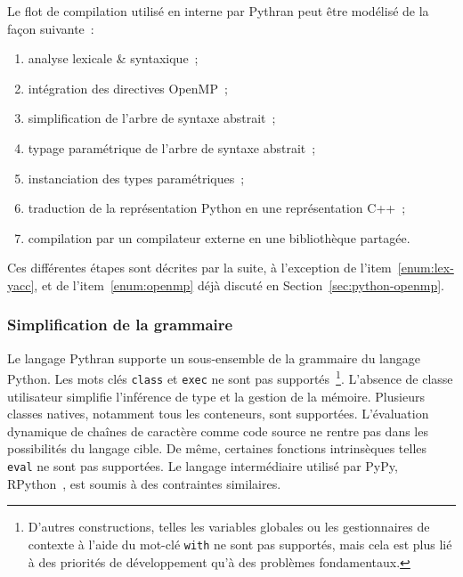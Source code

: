 \documentclass[renpar]{compas2013}
\begin{document}
Le flot de compilation utilisé en interne par Pythran peut être modélisé de la façon
suivante~:

\begin{enumerate}
  \item\label{enum:lex-yacc} analyse lexicale \& syntaxique~;
  \item\label{enum:openmp} intégration des directives OpenMP~;
  \item\label{enum:simplification-ast} simplification de l'arbre de syntaxe abstrait~;
  \item\label{enum:typage-ast} typage paramétrique de l'arbre de syntaxe abstrait~;
  \item\label{enum:instanciation-types} instanciation des types paramétriques~;
  \item\label{enum:traduction-cxx} traduction de la représentation Python en une représentation C++~;
  \item\label{enum:compilation-extrene} compilation par un compilateur externe en une bibliothèque
	partagée.
\end{enumerate}

Ces différentes étapes sont décrites par la suite, à l'exception de
l'item~\ref{enum:lex-yacc}, et de l'item~\ref{enum:openmp} déjà discuté en
Section~\ref{sec:python-openmp}.

\subsubsection{Simplification de la grammaire}

Le langage Pythran supporte un sous-ensemble de la grammaire du langage
Python. Les mots clés \texttt{class} et \texttt{exec} ne sont pas
supportés~\footnote{D'autres constructions, telles les variables globales
ou les gestionnaires de contexte à l'aide du mot-clé \texttt{with} ne sont
pas supportés, mais cela est plus lié à des priorités de développement
qu'à des problèmes fondamentaux.}. L'absence de classe utilisateur
simplifie l'inférence de type et la gestion de la mémoire. Plusieurs
classes natives, notamment tous les conteneurs, sont supportées.
L'évaluation dynamique de chaînes de caractère comme code source ne rentre
pas dans les possibilités du langage cible. De même, certaines fonctions
intrinsèques telles \texttt{eval} ne sont pas supportées. Le langage
intermédiaire utilisé par PyPy, RPython~\cite{rpython2007}, est soumis à
des contraintes similaires.
\end{document}
